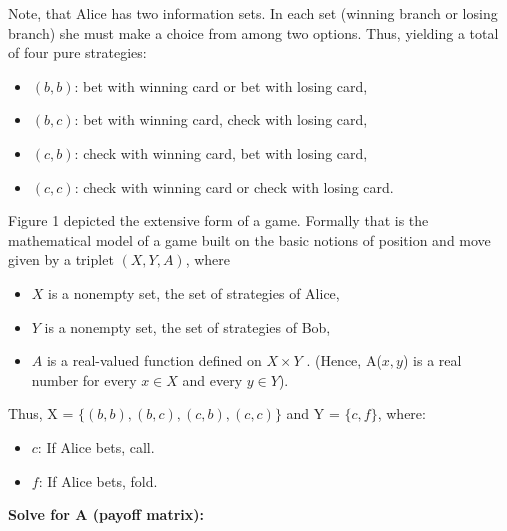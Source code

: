 \documentclass[12pt]{article}
\begin{document}
Note, that Alice has two information sets. In each set (winning branch or losing branch) she must make a choice from among two options. Thus, yielding a total of four pure strategies:
\begin{itemize}
    \item $(b,b)$: bet with winning card or bet with losing card,
    \item $(b, c)$: bet with winning card, check with losing card,
    \item $(c, b)$: check with winning card, bet with losing card,
    \item $(c, c)$: check with winning card or check with losing card.
\end{itemize}
Figure 1 depicted the extensive form of a game. Formally that is the mathematical model of a game built on the basic notions of position and move given by a triplet $(X, Y, A)$, where
\begin{itemize}
    \item $X$ is a nonempty set, the set of strategies of Alice,
    \item $Y$ is a nonempty set, the set of strategies of Bob,
    \item $A$ is a real-valued function defined on $X \times Y$ . (Hence, A($x, y$) is a real number for every $x \in X$ and every $y \in Y$).
\end{itemize}

Thus, X = $\{(b, b), (b, c), (c, b), (c, c)\}$ and Y = $\{c, f\}$, where:
\begin{itemize}
    \item $c$: If Alice bets, call.
    \item $f$: If Alice bets, fold.
\end{itemize}

\textbf{Solve for A (payoff matrix):}
\end{document}
